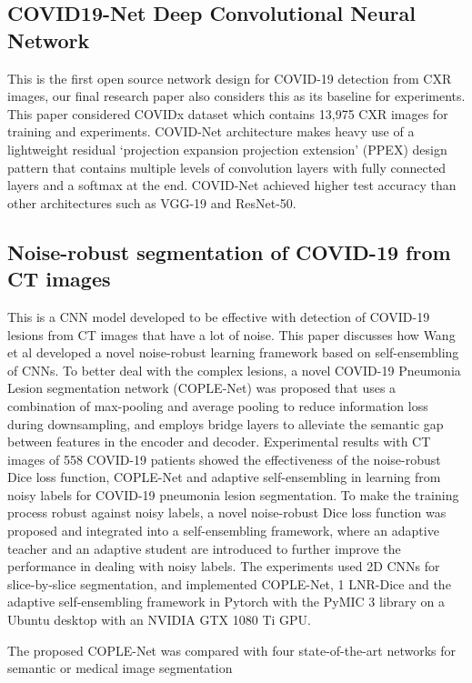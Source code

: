 \documentclass{sigkddExp}
\begin{document}
\subsection{COVID19-Net Deep Convolutional Neural Network}

This is the first open source network design for COVID-19 detection from CXR images,
our final research paper also considers this as its baseline for experiments.
This paper considered COVIDx dataset which contains 13,975 CXR images for training and
experiments. COVID-Net architecture makes heavy use of a lightweight residual
‘projection expansion projection extension’ (PPEX) design pattern that contains multiple
levels of convolution layers with fully connected layers and a softmax at the end.
COVID-Net achieved higher test accuracy than other architectures such as VGG-19 and ResNet-50.

\subsection{Noise-robust segmentation of COVID-19 from CT images}\cite{wang2020covidnet}

This is a CNN model developed to be effective with detection of COVID-19 lesions from 
CT images that have a lot of noise. This paper discusses how Wang et al developed a
novel noise-robust learning framework based on self-ensembling of CNNs.  To better
deal with the complex lesions, a novel COVID-19 Pneumonia Lesion segmentation network
(COPLE-Net) was proposed that uses a combination of max-pooling and average pooling to
reduce information loss during downsampling, and employs bridge layers to alleviate the
semantic gap between features in the encoder and decoder. Experimental results with CT
images of 558 COVID-19 patients showed the effectiveness of the noise-robust Dice loss
function, COPLE-Net and adaptive self-ensembling in learning from noisy labels for COVID-19
pneumonia lesion segmentation. To make the training process robust against noisy labels,
a novel noise-robust Dice loss function was proposed and integrated into a self-ensembling
framework, where an adaptive teacher and an adaptive student are introduced to further improve
the performance in dealing with noisy labels. The experiments used 2D CNNs for slice-by-slice
segmentation, and implemented COPLE-Net, 1 LNR-Dice and the adaptive self-ensembling framework
in Pytorch with the PyMIC 3 library on a Ubuntu desktop with an NVIDIA GTX 1080 Ti GPU. 

The proposed COPLE-Net was compared with four state-of-the-art networks for semantic or medical
image segmentation
\end{document}
